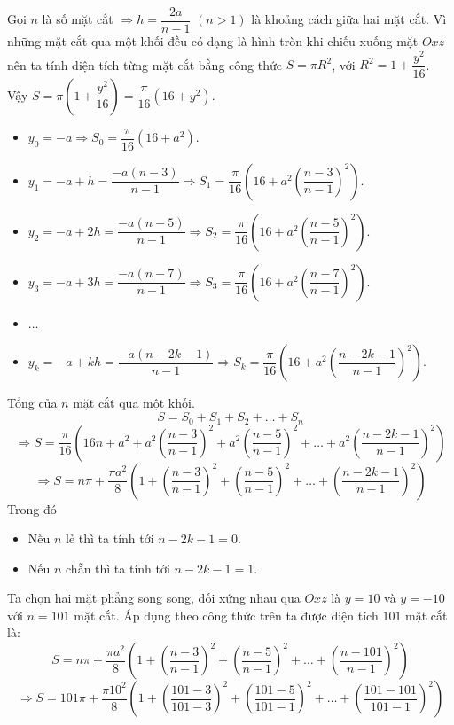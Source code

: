 \documentclass[12pt,a4paper]{article}
\begin{document}
Gọi $n$ là số mặt cắt $\Rightarrow h = \dfrac{2a}{n-1}$ $(n > 1)$ là khoảng cách giữa hai mặt cắt. Vì những mặt cắt qua một khối đều có dạng là hình tròn khi chiếu xuống mặt $Oxz$ nên ta tính diện tích từng mặt cắt bằng công thức $S = \pi R^2$, với $R^2 = 1 + \dfrac{y^2}{16}$. Vậy $S = \pi \left( 1 + \dfrac{y^2}{16} \right) = \dfrac{\pi}{16}\left( 16+ y^2 \right)$.
\begin{itemize}
    \item $y_0 = -a \Rightarrow S_0 = \dfrac{\pi}{16}\left( 16+ a^2 \right)$.
    \item $y_1 = -a + h = \dfrac{-a(n-3)}{n-1} \Rightarrow S_1 = \dfrac{\pi}{16}\left( 16+ a^2\left(\dfrac{n-3}{n-1} \right)^2\right)$.
    \item $y_2 = -a + 2h = \dfrac{-a(n-5)}{n-1} \Rightarrow S_2 = \dfrac{\pi}{16}\left( 16+ a^2\left(\dfrac{n-5}{n-1} \right)^2\right)$.
    \item $y_3 = -a + 3h = \dfrac{-a(n-7)}{n-1} \Rightarrow S_3 = \dfrac{\pi}{16}\left( 16+ a^2\left(\dfrac{n-7}{n-1} \right)^2\right)$.
    \item $\ldots$
    \item $y_k = -a + kh = \dfrac{-a(n-2k-1)}{n-1} \Rightarrow S_k = \dfrac{\pi}{16}\left( 16+ a^2\left(\dfrac{n-2k-1}{n-1} \right)^2\right)$.
\end{itemize}
Tổng của $n$ mặt cắt qua một khối.
\[
    S = S_0 + S_1 + S_2 + \ldots + S_n
\]
\[
    \Rightarrow S = \frac{\pi}{16}\left(16n + a^2 + a^2\left(\dfrac{n-3}{n-1} \right)^2 + a^2\left(\dfrac{n-5}{n-1} \right)^2 + \ldots + a^2\left(\dfrac{n-2k-1}{n-1} \right)^2 \right)    
\]
\[
    \Rightarrow S = n\pi +  \dfrac{\pi a^2}{8}\left(1 + \left(\dfrac{n-3}{n-1} \right)^2 + \left(\dfrac{n-5}{n-1} \right)^2 +\ldots+ \left(\dfrac{n-2k-1}{n-1} \right)^2\right)    
\]
Trong đó
\begin{itemize}
    \item Nếu $n$ lẻ thì ta tính tới $n - 2k - 1 = 0$.
    \item Nếu $n$ chẵn thì ta tính tới $n - 2k - 1 = 1$. 
\end{itemize}
Ta chọn hai mặt phẳng song song, đối xứng nhau qua $Oxz$ là $y = 10$ và $y = -10$ với $n = 101$ mặt cắt. Áp dụng theo công thức trên ta được diện tích $101$ mặt cắt là:
\[
    S = n\pi +  \dfrac{\pi a^2}{8}\left(1 + \left(\dfrac{n-3}{n-1} \right)^2 + \left(\dfrac{n-5}{n-1} \right)^2 +\ldots+ \left(\dfrac{n-101}{n-1} \right)^2\right)    
\]
\[
   \Rightarrow S = 101\pi + \dfrac{\pi 10^2}{8}\left( 1 + \left(\frac{101-3}{101-3}\right)^2 + \left(\frac{101-5}{101-1}\right)^2 + \ldots + \left(\frac{101-101}{101-1}\right)^2  \right)    
\]
\end{document}
